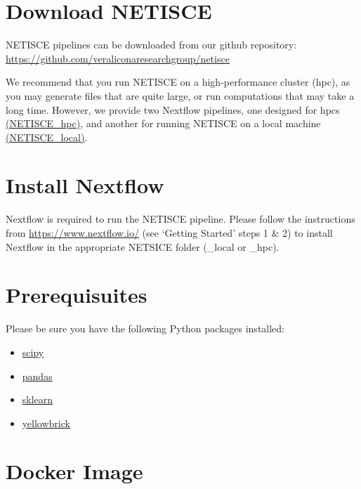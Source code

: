 \documentclass[
]{book}
\providecommand{\tightlist}{%
  \setlength{\itemsep}{0pt}\setlength{\parskip}{0pt}}
\begin{document}
\hypertarget{download-netisce}{%
\section{Download NETISCE}\label{download-netisce}}

NETISCE pipelines can be downloaded from our github repository: \url{https://github.com/veraliconaresearchgroup/netisce}

We recommend that you run NETISCE on a high-performance cluster (hpc), as you may generate files that are quite large, or run computations that may take a long time. However, we provide two Nextflow pipelines, one designed for hpcs \href{https://github.com/VeraLiconaResearchGroup/Netisce/tree/main/NETICSE_hpc}{(NETISCE\_hpc)}, and another for running NETISCE on a local machine \href{https://github.com/VeraLiconaResearchGroup/Netisce/tree/main/NETICSE_local}{(NETISCE\_local)}.

\hypertarget{install-nextflow}{%
\section{Install Nextflow}\label{install-nextflow}}

Nextflow is required to run the NETISCE pipeline. Please follow the instructions from \url{https://www.nextflow.io/} (see `Getting Started' steps 1 \& 2) to install Nextflow in the appropriate NETSICE folder (\_local or \_hpc).

\hypertarget{prerequisuites}{%
\section{Prerequisuites}\label{prerequisuites}}

Please be sure you have the following Python packages installed:

\begin{itemize}
\tightlist
\item
  \href{https://scipy.org/install/}{scipy}
\item
  \href{https://pandas.pydata.org/getting_started.html}{pandas}
\item
  \href{https://scikit-learn.org/stable/install.html}{sklearn}
\item
  \href{https://www.scikit-yb.org/en/latest/quickstart.html}{yellowbrick}
\end{itemize}

\hypertarget{docker-image}{%
\section{Docker Image}\label{docker-image}}
\end{document}
